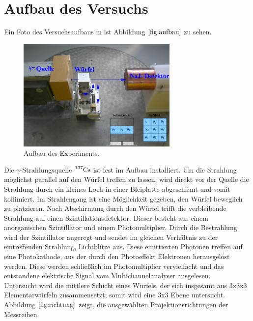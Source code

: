 \section{Aufbau des Versuchs}

Ein Foto des Versuchsaufbaus in ist Abbildung $\ref{fig:aufbau}$ zu sehen.
\begin{figure}[H]
  \centering
  \includegraphics[width=0.7\textwidth]{Bilder/aufbau.png}
  \caption{Aufbau des Experiments.\cite{anleitung}}
  \label{fig:aufbau}
\end{figure}

Die $\gamma$-Strahlungsquelle $\ce{^{137}Cs}$ ist fest im Aufbau installiert. Um die Strahlung möglichst parallel auf den Würfel treffen zu lassen, wird direkt vor der Quelle die Strahlung durch ein
kleines Loch in einer Bleiplatte abgeschirmt und somit kollimiert.
Im Strahlengang ist eine Möglichkeit gegeben, den Würfel beweglich zu platzieren.
Nach Abschirmung durch den Würfel trifft die verbleibende Strahlung auf einen Szintillationsdetektor.
Dieser besteht aus einem anorganischen Szintillator und einem Photomultiplier.
Durch die Bestrahlung wird der Szintillator angeregt und sendet im gleichen Verhältnis zu der eintreffenden Strahlung, Lichtblitze aus.
Diese emittierten Photonen treffen auf eine Photokathode, aus der durch den Photoeffekt Elektronen herausgelöst werden.
Diese werden schließlich im Photomultiplier vervielfacht und das entstandene elektrische Signal vom Multichannelanalyser ausgelesen.\\
Untersucht wird die mittlere Schicht eines Würfels, der sich insgesamt aus 3x3x3 Elementarwürfeln zusammensetzt; somit wird eine 3x3 Ebene untersucht.
Abbildung $\ref{fig:richtung}$ zeigt, die ausgewählten Projektionsrichtungen der Messreihen.
\clearpage
